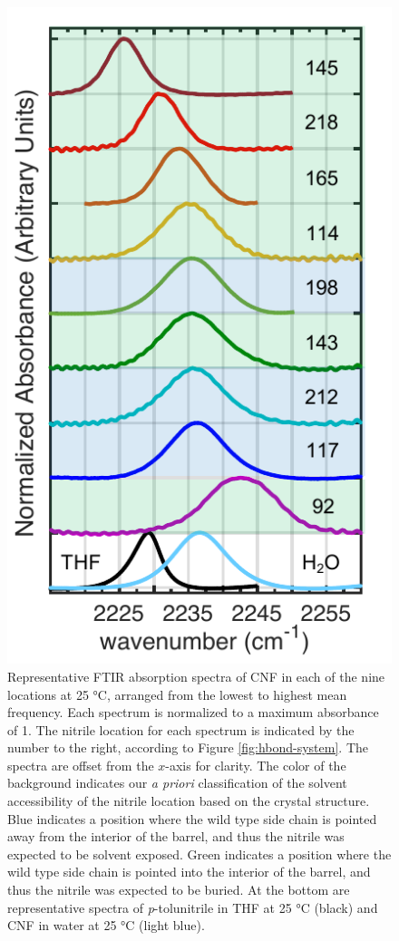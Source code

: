 \begin{figure}
    \center
    \includegraphics[width=\single]{figures-gfp-hbond/spectra_colors.pdf}
    \caption{
        Representative FTIR absorption spectra of CNF in each of the nine locations at 25 \si{\celsius}, arranged from the lowest to highest mean frequency. 
        Each spectrum is normalized to a maximum absorbance of 1. 
        The nitrile location for each spectrum is indicated by the number to the right, according to Figure \ref{fig:hbond-system}. 
        The spectra are offset from the $x$-axis for clarity. 
        The color of the background indicates our \emph{a priori} classification of the solvent accessibility of the nitrile location based on the crystal structure. 
        Blue indicates a position where the wild type side chain is pointed away from the interior of the barrel, and thus the nitrile was expected to be solvent exposed. 
        Green indicates a position where the wild type side chain is pointed into the interior of the barrel, and thus the nitrile was expected to be buried. 
        At the bottom are representative spectra of \emph{p}-tolunitrile in THF at 25 \si{\celsius} (black) and CNF in water at 25 \si{\celsius} (light blue).
    }
    \label{fig:hbond-spectra}
\end{figure}

